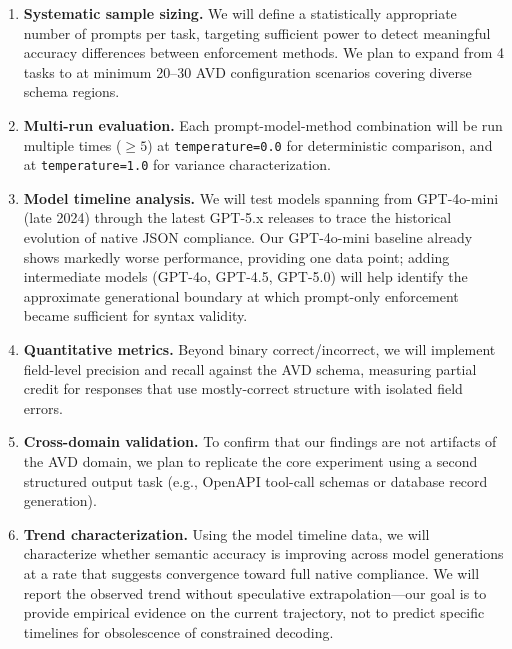 \documentclass[11pt, letterpaper]{article}
\begin{document}
\begin{enumerate}
    \item \textbf{Systematic sample sizing.} We will define a statistically appropriate number of prompts per task, targeting sufficient power to detect meaningful accuracy differences between enforcement methods. We plan to expand from 4 tasks to at minimum 20--30 AVD configuration scenarios covering diverse schema regions.
    \item \textbf{Multi-run evaluation.} Each prompt-model-method combination will be run multiple times ($\geq 5$) at \texttt{temperature=0.0} for deterministic comparison, and at \texttt{temperature=1.0} for variance characterization.
    \item \textbf{Model timeline analysis.} We will test models spanning from GPT-4o-mini (late 2024) through the latest GPT-5.x releases to trace the historical evolution of native JSON compliance. Our GPT-4o-mini baseline already shows markedly worse performance, providing one data point; adding intermediate models (GPT-4o, GPT-4.5, GPT-5.0) will help identify the approximate generational boundary at which prompt-only enforcement became sufficient for syntax validity.
    \item \textbf{Quantitative metrics.} Beyond binary correct/incorrect, we will implement field-level precision and recall against the AVD schema, measuring partial credit for responses that use mostly-correct structure with isolated field errors.
    \item \textbf{Cross-domain validation.} To confirm that our findings are not artifacts of the AVD domain, we plan to replicate the core experiment using a second structured output task (e.g., OpenAPI tool-call schemas or database record generation).
    \item \textbf{Trend characterization.} Using the model timeline data, we will characterize whether semantic accuracy is improving across model generations at a rate that suggests convergence toward full native compliance. We will report the observed trend without speculative extrapolation---our goal is to provide empirical evidence on the current trajectory, not to predict specific timelines for obsolescence of constrained decoding.
\end{enumerate}



\end{document}
